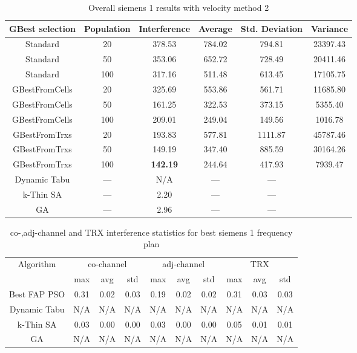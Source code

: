 \begin{table}[H]
\centering
	\begin{tabular}{cccccc}
	\toprule
    GBest selection & Population & Interference & Average & Std. Deviation & Variance \\
    \midrule
    Standard & 20 & 378.53 & 784.02 & 794.81 & 23397.43\\
    Standard & 50 & 353.06 & 652.72 & 728.49 & 20411.46\\
    Standard & 100 & 317.16 & 511.48 & 613.45 & 17105.75\\
    GBestFromCells & 20 & 325.69 & 553.86 & 561.71 & 11685.80\\
    GBestFromCells & 50 & 161.25 & 322.53 & 373.15 & 5355.40\\
    GBestFromCells & 100 & 209.01 & 249.04 & 149.56 & 1016.78\\
    GBestFromTrxs & 20 & 193.83 & 577.81 & 1111.87 & 45787.46\\
    GBestFromTrxs & 50 & 149.19 & 347.40 & 885.59 & 30164.26\\
    GBestFromTrxs & 100 & \textbf{142.19} & 244.64 & 417.93 & 7939.47\\
    \midrule
    Dynamic Tabu & --- & \small{N/A} & --- & --- \\
    k-Thin SA & --- & 2.20 & --- & --- \\
    GA & --- & 2.96 & --- & --- \\
    \bottomrule
	\end{tabular}
\caption{Overall siemens 1 results with velocity method 2}
\label{tab:siem1m2}
\end{table}
\begin{table}[H]
\centering
	\begin{tabular}{cccccccccc}
	\toprule
    Algorithm & \multicolumn{3}{c}{co-channel} & \multicolumn{3}{c}{adj-channel} & \multicolumn{3}{c}{TRX}\\
              & max & avg & std
              & max & avg & std
              & max & avg & std\\
    \midrule
    Best FAP PSO & 0.31 & 0.02 & 0.03 & 0.19 & 0.02 & 0.02 & 0.31 & 0.03 & 0.03\\ 
    Dynamic Tabu & \scriptsize{N/A} & \scriptsize{N/A} & \scriptsize{N/A} & \scriptsize{N/A} & \scriptsize{N/A} & \scriptsize{N/A} & \scriptsize{N/A} & \scriptsize{N/A} & \scriptsize{N/A}\\
    k-Thin SA & 0.03 & 0.00 & 0.00 & 0.03 & 0.00 & 0.00 & 0.05 & 0.01 & 0.01\\
    GA & \scriptsize{N/A} & \scriptsize{N/A} &  \scriptsize{N/A} &  \scriptsize{N/A} &  \scriptsize{N/A} &  \scriptsize{N/A} &  \scriptsize{N/A} &  \scriptsize{N/A} & \scriptsize{N/A}\\
    \bottomrule
	\end{tabular}
\caption{co-,adj-channel and TRX interference statistics for best siemens 1 frequency plan}
\label{tab:stats-siem1m1}
\end{table}
